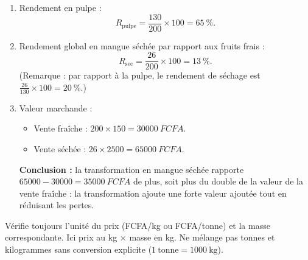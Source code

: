 \documentclass[11pt]{article}
\begin{document}
\begin{corrige}
\begin{enumerate}
\item Rendement en pulpe :
\[ R_{\text{pulpe}} = \frac{130}{200}\times 100 = \SI{65}{\percent}. \]
\item Rendement global en mangue séchée par rapport aux fruits frais :
\[ R_{\text{sec}} = \frac{26}{200}\times 100 = \SI{13}{\percent}. \]
(Remarque : par rapport à la pulpe, le rendement de séchage est $\frac{26}{130}\times 100 = \SI{20}{\percent}$.)
\item Valeur marchande :
\begin{itemize}
\item Vente fraîche : $200 \times 150 = \SI{30000}{FCFA}$.
\item Vente séchée : $26 \times 2500 = \SI{65000}{FCFA}$.
\end{itemize}
\textbf{Conclusion :} la transformation en mangue séchée rapporte $\num{65000} - \num{30000} = \SI{35000}{FCFA}$ de plus, soit plus du double de la valeur de la vente fraîche : la transformation ajoute une forte valeur ajoutée tout en réduisant les pertes.
\end{enumerate}
\end{corrige}

\begin{attention}
Vérifie toujours l'unité du prix (FCFA/kg ou FCFA/tonne) et la masse correspondante. Ici prix au kg $\times$ masse en kg. Ne mélange pas tonnes et kilogrammes sans conversion explicite ($1\ \text{tonne} = 1000\ \text{kg}$).
\end{attention}
\end{document}

